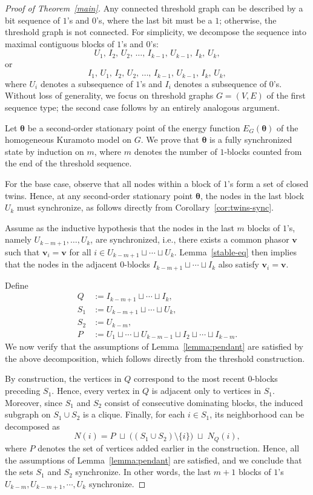 \documentclass[10pt,a4paper]{amsart}
\begin{document}
\begin{proof}[Proof of Theorem~\ref{main}]
Any connected threshold graph can be described by a bit sequence of $1$'s and $0$'s, where the last bit must be a $1$; otherwise, the threshold graph is not connected.
For simplicity, we decompose the sequence into maximal contiguous blocks of $1$'s and $0$'s:
\[
U_1,\, I_2,\, U_2,\, \dots,\, I_{k-1},\, U_{k-1},\, I_k,\, U_k,
\]
or
\[
I_1,\, U_1,\, I_2,\, U_2,\, \dots,\, I_{k-1},\, U_{k-1},\, I_k,\, U_k,
\]
where $U_i$ denotes a subsequence of $1$'s and $I_i$ denotes a subsequence of $0$'s.
Without loss of generality, we focus on threshold graphs $G=(V,E)$ of the first sequence type; the second case follows by an entirely analogous argument.

Let $\boldsymbol{\theta}$ be a second-order stationary point of the energy function $E_G(\boldsymbol{\theta})$ of the homogeneous Kuramoto model on $G$.
We prove that $\boldsymbol{\theta}$ is a fully synchronized state by induction on $m$, where $m$ denotes the number of $1$-blocks counted from the end of the threshold sequence.

For the base case, observe that all nodes within a block of $1$'s form a set of closed twins.
Hence, at any second-order stationary point $\boldsymbol{\theta}$, the nodes in the last block $U_k$ must synchronize, as follows directly from Corollary~\ref{cor:twins-sync}.

Assume as the inductive hypothesis that the nodes in the last $m$ blocks of $1$'s, namely $U_{k-m+1}, \ldots, U_k$, are synchronized, i.e., there exists a common phasor $\boldsymbol{v}$ such that $\boldsymbol{v}_i = \boldsymbol{v}$ for all $i \in U_{k-m+1} \sqcup \cdots \sqcup U_k$. Lemma~\ref{stable-eq} then implies that the nodes in the adjacent $0$-blocks $I_{k-m+1} \sqcup \cdots \sqcup I_k$ also satisfy $\boldsymbol{v}_i = \boldsymbol{v}$.

Define
\[
\begin{aligned}
Q   &:= I_{k-m+1} \sqcup \cdots \sqcup I_k, \\
S_1 &:= U_{k-m+1} \sqcup \cdots \sqcup U_k, \\
S_2 &:= U_{k-m}, \\
P   &:= U_1 \sqcup \cdots \sqcup U_{k-m-1}
         \sqcup I_2 \sqcup \cdots \sqcup I_{k-m}.
\end{aligned}
\]
We now verify that the assumptions of Lemma~\ref{lemma:pendant} are satisfied by the above
decomposition, which follows directly from the threshold construction.

By construction, the vertices in $Q$ correspond to the most recent $0$-blocks
preceding $S_1$. Hence, every vertex in $Q$ is adjacent only to vertices in $S_1$.
Moreover, since $S_1$ and $S_2$ consist of consecutive dominating blocks,
the induced subgraph on $S_1 \cup S_2$ is a clique.
Finally, for each $i\in S_1$, its neighborhood can be decomposed as
\[
N(i) = P \;\sqcup\; \bigl((S_1\cup S_2)\setminus\{i\}\bigr) \;\sqcup\; N_Q(i),
\]
where $P$ denotes the set of vertices added earlier in the construction.
Hence, all the assumptions of Lemma~\ref{lemma:pendant} are satisfied,
and we conclude that the sets $S_1$ and $S_2$ synchronize.
In other words, the last $m+1$ blocks of $1$'s $U_{k-m}, U_{k-m+1}, \cdots, U_k$ synchronize.


\end{proof}
\end{document}
